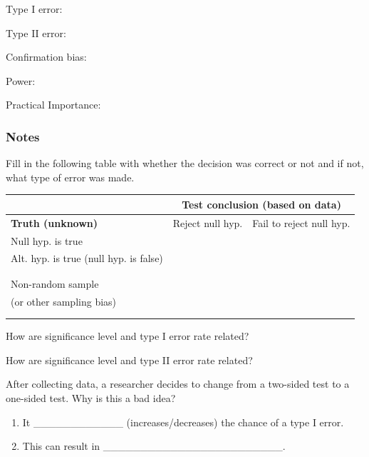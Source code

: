 \documentclass[
]{report}
\newcommand{\rgs}{\vspace{12pt}} %
\begin{document}
Type I error:
\rgs

Type II error:
\rgs

Confirmation bias:
\rgs

Power:
\rgs

Practical Importance:
\rgs

\hypertarget{notes-21}{%
\subsubsection*{Notes}\label{notes-21}}

Fill in the following table with whether the decision was correct or not and if not, what type of error was made.

\begin{center}
\begin{tabular}{|p{2in}|p{2in}|p{2in}|}
\hline
 & \multicolumn{2}{|c|}{\textbf{Test conclusion (based on data)}} \\ \hline
 \textbf{Truth (unknown)} & Reject null hyp. & Fail to reject null hyp. \\ \hline
 Null hyp. is true && \\ 
 Alt. hyp. is true (null hyp. is false) & & \\ 
  & & \\
   & & \\ \hline
   Non-random sample && \\ 
   (or other sampling bias) & & \\ 
  & & \\
   & & \\ \hline
\end{tabular}
\end{center}

\rgs

How are significance level and type I error rate related?
\rgs

How are significance level and type II error rate related?
\rgs

After collecting data, a researcher decides to change from a two-sided test to a one-sided test. Why is this a bad idea?

\begin{enumerate}
\def\labelenumi{\arabic{enumi}.}
\item
  It \_\_\_\_\_\_\_\_\_\_\_\_ (increases/decreases) the chance of a type I error.
\item
  This can result in \_\_\_\_\_\_\_\_\_\_\_\_\_\_\_\_\_\_\_\_\_\_\_\_.
  \rgs
\end{enumerate}
\end{document}
